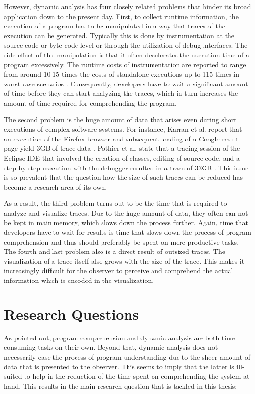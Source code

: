 However, dynamic analysis has four closely related problems that hinder its broad application down to the present day.
First, to collect runtime information, the execution of a program has to be manipulated in a way that traces of the execution can be generated.
Typically this is done by instrumentation at the source code or byte code level or through the utilization of debug interfaces.
The side effect of this manipulation is that it often decelerates the execution time of a program excessively.
The runtime costs of instrumentation are reported to range from around 10-15 times the costs of standalone executions up to 115 times in worst case scenarios \cite{pothier_scalable_2007, karran_synctrace:_2013}.
Consequently, developers have to wait a significant amount of time before they can start analyzing the traces, which in turn increases the amount of time required for comprehending the program.

The second problem is the huge amount of data that arises even during short executions of complex software systems.
For instance, Karran et al. report that an execution of the Firefox browser and subsequent loading of a Google result page yield 3GB of trace data \cite{missing}.
Pothier et al. state that a tracing session of the Eclipse IDE that involved the creation of classes, editing of source code, and a step-by-step execution with the debugger resulted in a trace of 33GB \cite{pothier_scalable_2007}.
This issue is so prevalent that the question how the size of such traces can be reduced  has become a research area of its own.

As a result, the third problem turns out to be the time that is required to analyze and visualize traces.
Due to the huge amount of data, they often can not be kept in main memory, which slows down the process further.
Again, time that developers have to wait for results is time that slows down the process of program comprehension and thus should preferably be spent on more productive tasks.
The fourth and last problem also is a direct result of outsized traces.
The visualization of a trace itself also grows with the size of the trace.
This makes it increasingly difficult for the observer to perceive and comprehend the actual information which is encoded in the visualization.

\section{Research Questions}
As pointed out, program comprehension and dynamic analysis are both time consuming tasks on their own.
Beyond that, dynamic analysis does not necessarily ease the process of program understanding due to the sheer amount of data that is presented to the observer.
This seems to imply that the latter is ill-suited to help in the reduction of the time spent on comprehending the system at hand.
This results in the main research question that is tackled in this thesis:

